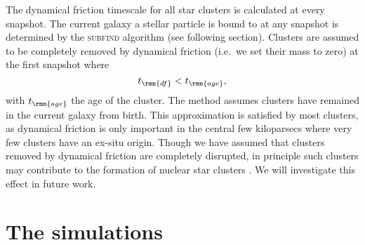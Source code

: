 \documentclass[fleqn,usenatbib]{mnras}
\begin{document}
The dynamical friction timescale for all star clusters is calculated at every snapshot. The current galaxy a stellar particle is bound to at any snapshot is determined by the \textsc{subfind} \citep{Springel_et_al_01, Dolag_et_al_09} algorithm (see following section). Clusters are assumed to be completely removed by dynamical friction (i.e.~we set their mass to zero) at the first snapshot where
\begin{equation}
t_\rmn{df} < t_\rmn{age} ,
\end{equation}
with $t_\rmn{age}$ the age of the cluster.
The method assumes clusters have remained in the current galaxy from birth. This approximation is satisfied by most clusters, as dynamical friction is only important in the central few kiloparsecs where very few clusters have an ex-situ origin.
Though we have assumed that clusters removed by dynamical friction are completely disrupted, in principle such clusters may contribute to the formation of nuclear star clusters \citep[e.g.][]{Capuzzo-Dolcetta_and_Miocchi_08}. We will investigate this effect in future work. 



\section{The simulations} \label{sec:sims}
\end{document}
